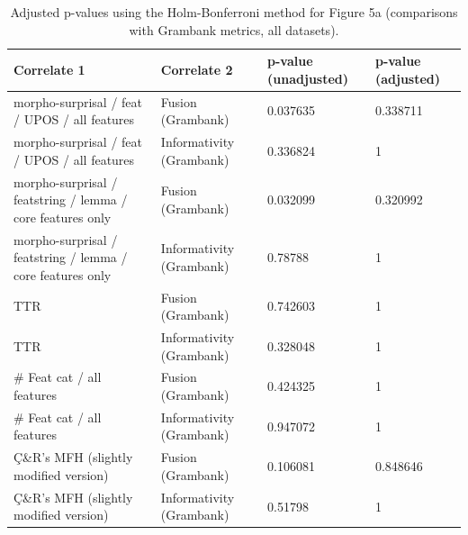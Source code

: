 \documentclass[USenglish]{article}
\begin{document}
\begin{table}[ht]
    \centering
    \caption{Adjusted p-values using the Holm-Bonferroni method \citep{holm_simple_1979} for Figure 5a
    (comparisons with Grambank metrics, all datasets). } %
    \label{tab:p_values_adjusted_grambank_all}   
   \begin{tabular}{p{3.1cm}p{3.1cm}p{2.4cm}p{2.4cm}}
\toprule
	\textbf{Correlate 1}	&	\textbf{Correlate 2}& \textbf{p-value \newline(unadjusted)}    &	\textbf{p-value \newline(adjusted)}	\\
    \midrule
    morpho-surprisal /   feat /   UPOS /   all features	&	Fusion (Grambank)	&	0.037635	& 0.338711	\\ \midrule
morpho-surprisal /   feat /   UPOS /   all features	&	Informativity (Grambank)	&	0.336824	&1\\ \midrule
morpho-surprisal /   featstring  /    lemma /   core features only	&	Fusion (Grambank)	&	0.032099&	0.320992\\ \midrule
morpho-surprisal /   featstring  /    lemma /   core features only	&	Informativity (Grambank)	&	0.78788	&1	\\ \midrule
TTR	&	Fusion (Grambank)	&	0.742603&	1	\\ \midrule
TTR	&	Informativity (Grambank)	&	0.328048&	1	\\ \midrule
\# Feat cat /   all features	&	Fusion (Grambank)	&	0.424325&	1	\\ \midrule
\# Feat cat /   all features	&	Informativity (Grambank)	&0.947072	&1	\\ \midrule
Ç\&R's MFH (slightly modified version)	&	Fusion (Grambank)	&	0.106081 &	0.848646
	\\ \midrule
Ç\&R's MFH (slightly modified version)	&	Informativity (Grambank)	&0.51798 &	1
\\ \bottomrule
    
\end{tabular}
\end{table}
\end{document}
